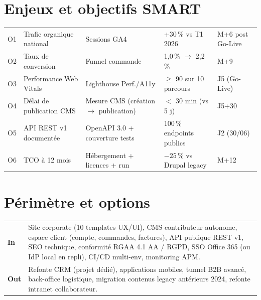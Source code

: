 \documentclass[11pt,a4paper,oneside]{report}
\begin{document}
\section{Enjeux et objectifs SMART}

\renewcommand{\arraystretch}{1.4}
\begin{tabularx}{\textwidth}{C{1cm} L{5cm} L{3cm} C{2.5cm} L{3cm}}
\toprule
{}\th{\#} &  &  &  &  \\
\midrule
O1 & Trafic organique national & Sessions GA4 & +30\,\% vs T1 2026 & M+6 post Go-Live \\
O2 & Taux de conversion        & Funnel commande & 1{,}0\,\% $\rightarrow$ 2{,}2\,\% & M+9 \\
O3 & Performance Web Vitals    & Lighthouse Perf./A11y & $\geq$ 90 sur 10 parcours & J5 (Go-Live) \\
O4 & Délai de publication CMS  & Mesure CMS (création $\rightarrow$ publication) & $<$ 30 min (vs 5 j) & J5+30 \\
O5 & API REST v1 documentée    & OpenAPI 3.0 + couverture tests & 100\,\% endpoints publics & J2 (30/06) \\
O6 & TCO à 12 mois             & Hébergement + licences + run & $-25\,\%$ vs Drupal legacy & M+12 \\
\bottomrule
\end{tabularx}

\section{Périmètre et options}

\renewcommand{\arraystretch}{1.3}
\begin{tabularx}{\textwidth}{L{1.5cm} Y}
\toprule
{}\th{} &  \\
\midrule
{}\textbf{In} & Site corporate (10 templates UX/UI), CMS contributeur autonome, espace client (compte, commandes, factures), API publique REST v1, SEO technique, conformité RGAA 4.1 AA / RGPD, SSO Office 365 (ou IdP local en repli), CI/CD multi-env, monitoring APM. \\
\textbf{Out} & Refonte CRM (projet dédié), applications mobiles, tunnel B2B avancé, back-office logistique, migration contenus legacy antérieurs 2024, refonte intranet collaborateur. \\
\bottomrule
\end{tabularx}
\end{document}
